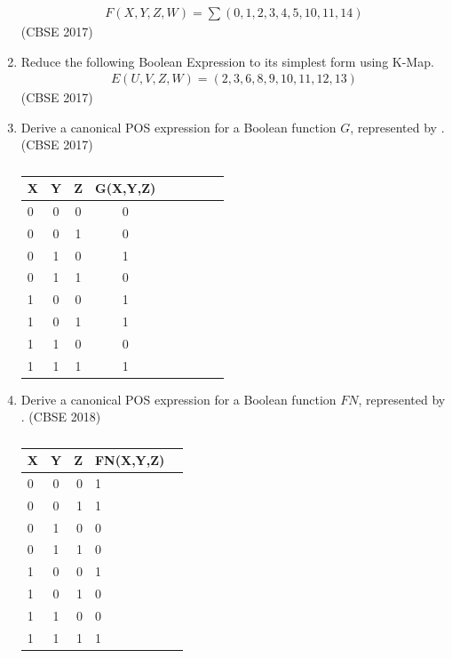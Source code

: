 \begin{enumerate}[label=\arabic*.,ref=\theenumi]
\label{prob:2017-1/c/6/d}
		\begin{align*}
F(X,Y,Z,W) = \sum(0,1,2,3,4,5,10,11,14)
		\end{align*}
\hfill (CBSE 2017)
	\item
		Reduce the following Boolean Expression to its simplest form using K-Map.
\label{prob:2017/c/6/d}
		\begin{align*}
E(U,V,Z,W)=   (2 , 3 , 6 , 8 , 9 , 10 , 11 , 12 , 13 )
		\end{align*}
\hfill (CBSE 2017)
	\item Derive a canonical POS expression for a Boolean function $G$, represented by 
.
\label{prob:2017/c/6/c}
\hfill (CBSE 2017)
		\begin{table}[H]
 \begin{center}
    \begin{tabular}{|l|c|c|c|c|c|c|c|c|} \hline 
  \textbf{X}& \textbf{Y} & \textbf{Z} &\textbf{G(X,Y,Z)} \\
 \hline
 0&0&0&0\\ \hline
0&0&1&0 \\ \hline
0&1&0&1\\ \hline
0&1&1&0  \\ \hline
1&0&0&1\\ \hline
1&0&1&1\\ \hline
1&1&0&0\\ \hline
1&1&1&1\\ \hline
\end{tabular}   
\end{center}
\caption{}
\label{tab:2017/c/6/c}
\end{table}
\item Derive a canonical POS expression for a Boolean function $FN$, represented by 
.
\label{prob:2018/c/6/c}
\hfill (CBSE 2018)
		\begin{table}[H]
			\centering
\begin{tabular}{|l|c|r|l|c|}
    \hline %
      \textbf{X} & \textbf{Y} & \textbf{Z} & \textbf{FN(X,Y,Z)}\\
      \hline
      0 & 0 & 0 & 1\\
\hline
      0 & 0 & 1 & 1\\
\hline
      0 & 1 & 0 & 0\\
\hline
      0 & 1 & 1 & 0\\
\hline
      1 & 0 & 0 & 1\\
\hline
      1 & 0 & 1 & 0\\
\hline
      1 & 1 & 0 & 0\\
\hline
      1 & 1 & 1 & 1\\
      \hline      
   \end{tabular}
\caption{}
\label{tab:2018/c/6/c}
   \end{table}


\end{enumerate}
